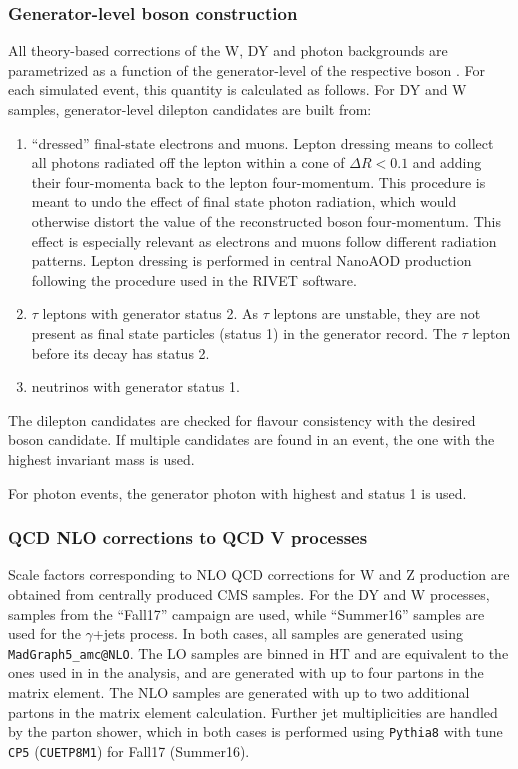 \subsubsection{Generator-level boson construction}
All theory-based corrections of the W, DY and photon backgrounds are parametrized as a function of the generator-level \pt of the respective boson \ptv. For each simulated event, this quantity is calculated as follows. For DY and W samples, generator-level dilepton candidates are built from:

\begin{enumerate}
\item ``dressed'' final-state electrons and muons. Lepton dressing means to collect all photons radiated off the lepton within a cone of $\Delta R < 0.1$ and adding their four-momenta back to the lepton four-momentum. This procedure is meant to undo the effect of final state photon radiation, which would otherwise distort the value of the reconstructed boson four-momentum. This effect is especially relevant as electrons and muons follow different radiation patterns. Lepton dressing is performed in central NanoAOD production following the procedure used in the RIVET software.
\item $\tau$ leptons with generator status 2. As $\tau$ leptons are unstable, they are not present as final state particles (status 1) in the generator record. The $\tau$ lepton before its decay has status 2.
\item neutrinos with generator status 1.
\end{enumerate}

The dilepton candidates are checked for flavour consistency with the desired boson candidate. If multiple candidates are found in an event, the one with the highest invariant mass is used.

For photon events, the generator photon with highest \pt and status 1 is used.

\subsubsection{QCD NLO corrections to QCD V processes}

Scale factors corresponding to NLO QCD corrections for W and Z production are obtained from centrally produced CMS samples. For the DY and W processes, samples from the ``Fall17'' campaign are used, while ``Summer16'' samples are used for the $\gamma$+jets process. In both cases, all samples are generated using \texttt{MadGraph5\_amc@NLO}. The LO samples are binned in HT and are equivalent to the ones used in in the analysis, and are generated with up to four partons in the matrix element. The NLO samples are generated with up to two additional partons in the matrix element calculation. Further jet multiplicities are handled by the parton shower, which in both cases is performed using \texttt{Pythia8} with tune \texttt{CP5} (\texttt{CUETP8M1}) for Fall17 (Summer16).

